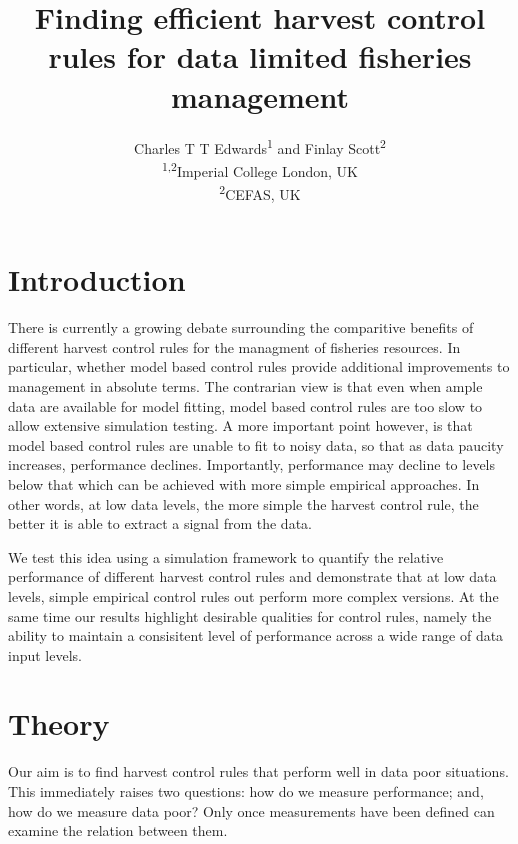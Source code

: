 \documentclass[11pt]{article} %
\title{Finding efficient harvest control rules for data limited fisheries management}
\author{
	Charles T T Edwards\textsuperscript{1} and Finlay Scott\textsuperscript{2}
	\\\textsuperscript{1,2}Imperial College London, UK\\\textsuperscript{2}CEFAS, UK
	}
\date{}
\begin{document}
\maketitle

\section{Introduction}

There is currently a growing debate surrounding the comparitive benefits of different harvest control rules for the managment of fisheries resources. In particular, whether model based control rules provide additional improvements to management in absolute terms. The contrarian view is that even when ample data are available for model fitting, model based control rules are too slow to allow extensive simulation testing. A more important point however, is that model based control rules are unable to fit to noisy data, so that as data paucity increases, performance declines. Importantly, performance may decline to levels below that which can be achieved with more simple empirical approaches. In other words, at low data levels, the more simple the harvest control rule, the better it is able to extract a signal from the data.

We test this idea using a simulation framework to quantify the relative performance of different harvest control rules and demonstrate that at low data levels, simple empirical control rules out perform more complex versions. At the same time our results highlight desirable qualities for control rules, namely the ability to maintain a consisitent level of performance across a wide range of data input levels.

\section{Theory}

Our aim is to find harvest control rules that perform well in data poor situations. This immediately raises two questions: how do we measure performance; and, how do we measure data poor? Only once measurements have been defined can examine the relation between them.
\end{document}
